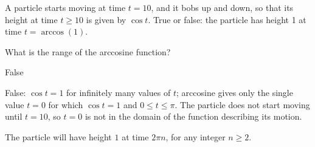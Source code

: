 \begin{question} A particle starts moving at time $t=10$, and it bobs up and down, so that its height at time $t \geq 10$ is given by $\cos t$. True or false: the particle has height 1 at time $t=\arccos(1)$.
\end{question}
\begin{hint}
What is the range of the arccosine function?
\end{hint}
\begin{answer} False
\end{answer}
\begin{solution}
False:  $\cos t=1$ for infinitely many values of $t$; arccosine gives only the single value $t=0$ for which $\cos t=1$ and $0 \leq t \leq \pi$. The particle does not start moving until $t=10$, so $t=0$ is not in the domain of the function describing its motion.

The particle will have height $1$ at time $2\pi n$, for any integer $n \geq 2$.
\end{solution}


